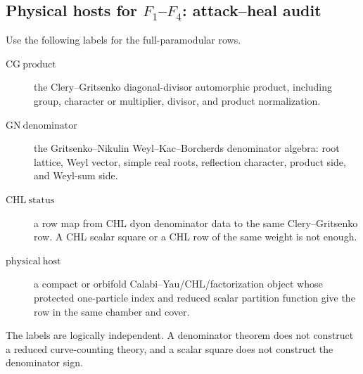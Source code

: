 \subsection{\texorpdfstring{Physical hosts for \(F_1\)--\(F_4\):
attack--heal audit}{Physical hosts for F1-F4: attack-heal audit}}

\begin{definition}
Use the following labels for the full-paramodular rows.
\begin{description}
\item[\(\mathrm{CG\ product}\)] the Clery--Gritsenko
diagonal-divisor automorphic product, including group, character or
multiplier, divisor, and product normalization.
\item[\(\mathrm{GN\ denominator}\)] the Gritsenko--Nikulin
Weyl--Kac--Borcherds denominator algebra: root lattice, Weyl vector,
simple real roots, reflection character, product side, and Weyl-sum
side.
\item[\(\mathrm{CHL\ status}\)] a row map from CHL dyon denominator
data to the same Clery--Gritsenko row.  A CHL scalar square or a CHL
row of the same weight is not enough.
\item[\(\mathrm{physical\ host}\)] a compact or orbifold
Calabi--Yau/CHL/factorization object whose protected one-particle index
and reduced scalar partition function give the row in the same chamber
and cover.
\end{description}
The labels are logically independent.  A denominator theorem does not
construct a reduced curve-counting theory, and a scalar square does not
construct the denominator sign.
\end{definition}


